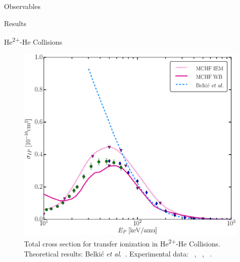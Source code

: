 \documentclass[letterpaper, 11 pt]{report}
\begin{document}
\begin{chapter}{Observables \label{chap:p-he2p-he}}
\begin{section}{Results \label{sec:phe2p-res}}
\begin{subsection}{\texorpdfstring{He\textsuperscript{2+}}{He2+}-He Collisions 
                         \label{sec:he2phe-res}}
\begin{figure}[ht]
\begin{minipage}{.49\linewidth}
               \centering
               \includegraphics[width = \linewidth]{./images/he2phe/he2phe-IP.eps}
               \caption[Total cross section for transfer ionization in He\textsuperscript{2+}-He
                        Collisions.]{Total cross section for transfer ionization in
                        He\textsuperscript{2+}-He Collisions. Theoretical results: Belki\'{c}
                        \textit{et al}.~\cite{BMM-97}.
                        Experimental data: {\color{blue}{$\blacklozenge$}}~\cite{SG85},
                        {\color{OliveGreen}{$\bullet$}}~\cite{SG89},
                        {\color{RedViolet}{$\blacktriangledown$}}~\cite{Dubois87}. \label{fig:he2phe-ip}}
            \end{minipage} \hspace{0.04\linewidth} %
            \begin{minipage}{.49\linewidth}


\end{minipage}
\end{figure}
\end{subsection}
\end{section}
\end{chapter}
\end{document}

